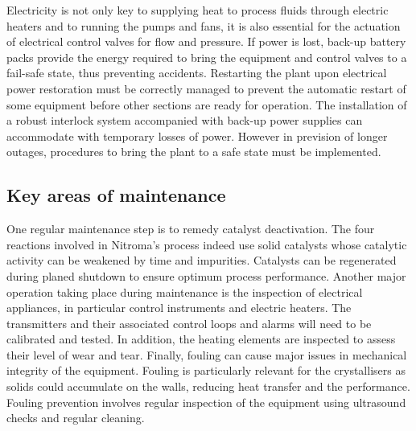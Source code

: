 Electricity is not only key to supplying heat to process fluids through electric heaters and to running the pumps and fans, it is also essential for the actuation of electrical control valves for flow and pressure. If power is lost, back-up battery packs provide the energy required to bring the equipment and control valves to a fail-safe state, thus preventing accidents. Restarting the plant upon electrical power restoration must be correctly managed to prevent the automatic restart of some equipment before other sections are ready for operation. The installation of a robust interlock system accompanied with back-up power supplies can accommodate with temporary losses of power. However in prevision of longer outages, procedures to bring the plant to a safe state must be implemented.


\subsection{Key areas of maintenance} %
One regular maintenance step is to remedy catalyst deactivation. The four reactions involved in Nitroma's process indeed use solid catalysts whose catalytic activity can be weakened by time and impurities. Catalysts can be regenerated during planed shutdown to ensure optimum process performance. Another major operation taking place during maintenance is the inspection of electrical appliances, in particular control instruments and electric heaters. The transmitters and their associated control loops and alarms will need to be calibrated and tested. In addition, the heating elements are inspected to assess their level of wear and tear. Finally, fouling can cause major issues in mechanical integrity of the equipment. Fouling is particularly relevant for the crystallisers as solids could accumulate on the walls, reducing heat transfer and the performance. Fouling prevention involves regular inspection of the equipment using ultrasound checks and regular cleaning.